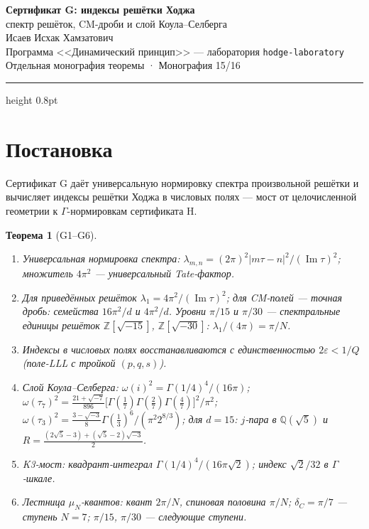 \documentclass[11pt,a4paper]{article}
\theoremstyle{plain}
\newtheorem{theorem}{Теорема}
\theoremstyle{definition}
\theoremstyle{remark}
\newcommand{\ZZ}{\mathbb{Z}}
\newcommand{\QQ}{\mathbb{Q}}
\newcommand{\Ga}{\Gamma}
\newcommand{\im}{\operatorname{Im}}
\begin{document}
\begin{center}
{\LARGE\bfseries Сертификат G: индексы решётки Ходжа}\\[0.4em]
{\large спектр решёток, CM-дроби и слой Коула–Селберга}\\[0.6em]
{\normalsize Исаев Исхак Хамзатович}\\[0.2em]
{\small Программа <<Динамический принцип>> --- лаборатория \texttt{hodge-laboratory}}\\[0.15em]
{\small Отдельная монография теоремы · Монография 15/16}
\end{center}
\vspace{0.4em}
{\color{linkblue}\hrule height 0.8pt}
\vspace{0.8em}

\section{Постановка}

Сертификат G даёт универсальную нормировку спектра произвольной
решётки и вычисляет индексы решётки Ходжа в числовых полях ---
мост от целочисленной геометрии к $\Ga$-нормировкам сертификата H.

\begin{theorem}[G1--G6]\label{th:Gstand}
\begin{enumerate}[leftmargin=2em]
\item[(G1)] Универсальная нормировка спектра:
$\lambda_{m,n}=(2\pi)^2|m\tau-n|^2/(\im\tau)^2$; множитель $4\pi^2$
--- универсальный Tate-фактор.
\item[(G2)] Для приведённых решёток $\lambda_1=4\pi^2/(\im\tau)^2$;
для CM-полей --- точная дробь: семейства $16\pi^2/d$ и $4\pi^2/d$.
Уровни $\pi/15$ и $\pi/30$ --- спектральные единицы решёток
$\ZZ[\sqrt{-15}]$, $\ZZ[\sqrt{-30}]$: $\lambda_1/(4\pi)=\pi/N$.
\item[(G3)] Индексы в числовых полях восстанавливаются с
единственностью $2\varepsilon<1/Q$ (поле-LLL с тройкой $(p,q,s)$).
\item[(G4)] Слой Коула--Селберга: $\omega(i)^2=\Ga(1/4)^4/(16\pi)$;
$\omega(\tau_7)^2=\frac{21+\sqrt{-7}}{896}
\bigl[\Ga(\frac17)\Ga(\frac27)\Ga(\frac47)\bigr]^2/\pi^2$;
$\omega(\tau_3)^2=\frac{3-\sqrt{-3}}8
\Ga(\frac13)^6/(\pi^2 2^{8/3})$; для $d=15$: $j$-пара в
$\QQ(\sqrt5)$ и $R=\frac{(2\sqrt5-3)+(\sqrt5-2)\sqrt{-3}}2$.
\item[(G5)] K3-мост: квадрант-интеграл $\Ga(1/4)^4/(16\pi\sqrt2)$;
индекс $\sqrt2/32$ в $\Ga$-шкале.
\item[(G6)] Лестница $\mu_N$-квантов: квант $2\pi/N$, спиновая
половина $\pi/N$; $\delta_C=\pi/7$ --- ступень $N=7$; $\pi/15$,
$\pi/30$ --- следующие ступени.
\end{enumerate}
\end{theorem}
\end{document}
